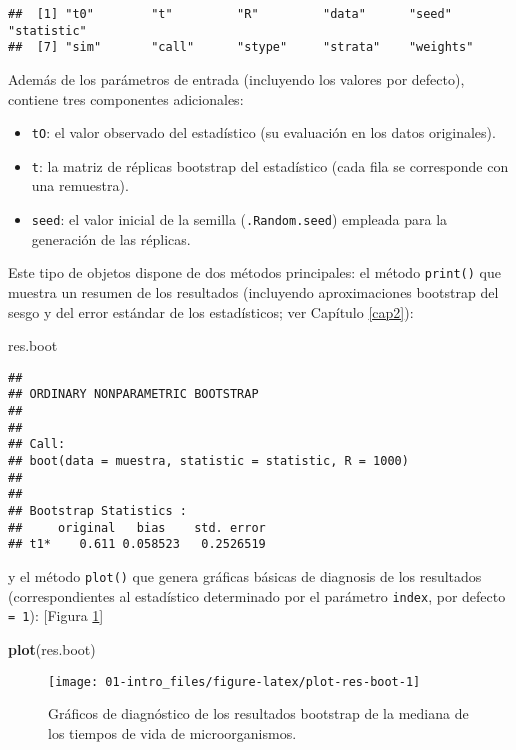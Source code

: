 \documentclass[
]{book}
\newenvironment{Shaded}{\begin{snugshade}}{\end{snugshade}}
\newcommand{\KeywordTok}[1]{\textcolor[rgb]{0.13,0.29,0.53}{\textbf{#1}}}
\newcommand{\NormalTok}[1]{#1}
\theoremstyle{definition}
\theoremstyle{definition}
\theoremstyle{definition}
\theoremstyle{remark}
\begin{document}
\begin{verbatim}
##  [1] "t0"        "t"         "R"         "data"      "seed"      "statistic"
##  [7] "sim"       "call"      "stype"     "strata"    "weights"
\end{verbatim}

Además de los parámetros de entrada (incluyendo los valores por defecto), contiene tres componentes adicionales:

\begin{itemize}
\item
  \texttt{tO}: el valor observado del estadístico
  (su evaluación en los datos originales).
\item
  \texttt{t}: la matriz de réplicas bootstrap del estadístico
  (cada fila se corresponde con una remuestra).
\item
  \texttt{seed}: el valor inicial de la semilla (\texttt{.Random.seed})
  empleada para la generación de las réplicas.
\end{itemize}

Este tipo de objetos dispone de dos métodos principales:
el método \texttt{print()} que muestra un resumen de los resultados
(incluyendo aproximaciones bootstrap del sesgo y del error
estándar de los estadísticos; ver Capítulo \ref{cap2}):

\begin{Shaded}
\begin{Highlighting}[]
\NormalTok{res.boot}
\end{Highlighting}
\end{Shaded}

\begin{verbatim}
## 
## ORDINARY NONPARAMETRIC BOOTSTRAP
## 
## 
## Call:
## boot(data = muestra, statistic = statistic, R = 1000)
## 
## 
## Bootstrap Statistics :
##     original   bias    std. error
## t1*    0.611 0.058523   0.2526519
\end{verbatim}

y el método \texttt{plot()} que genera gráficas básicas de diagnosis
de los resultados (correspondientes al estadístico determinado por el parámetro \texttt{index}, por defecto \texttt{=\ 1}): {[}Figura \ref{fig:plot-res-boot}{]}

\begin{Shaded}
\begin{Highlighting}[]
\KeywordTok{plot}\NormalTok{(res.boot)}
\end{Highlighting}
\end{Shaded}

\begin{figure}[!htb]

{\centering \texttt{[image: 01-intro\_files/figure-latex/plot-res-boot-1]} 

}

\caption{Gráficos de diagnóstico de los resultados bootstrap de la mediana de los tiempos de vida de microorganismos.}\label{fig:plot-res-boot}
\end{figure}
\end{document}
